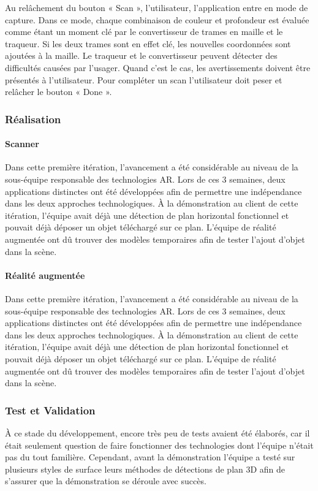 \documentclass[rapport.tex]{subfiles}
\begin{document}
\par
Au relâchement du bouton « Scan », l’utilisateur, l’application entre en mode de capture. Dans ce mode, chaque combinaison de couleur et profondeur est évaluée comme étant un moment clé par le convertisseur de trames en maille et le traqueur. Si les deux trames sont en effet clé, les nouvelles coordonnées sont ajoutées à la maille. Le traqueur et le convertisseur peuvent détecter des difficultés causées par l’usager. Quand c’est le cas, les avertissements doivent être présentés à l’utilisateur. Pour compléter un scan l’utilisateur doit peser et relâcher le bouton « Done ».
\subsubsection*{Réalisation}
\paragraph*{Scanner}
Dans cette première itération, l’avancement a été considérable au niveau de la sous-équipe responsable des technologies AR. Lors de ces 3 semaines, deux applications distinctes ont été développées afin de permettre une indépendance dans les deux approches technologiques. À la démonstration au client de cette itération, l’équipe avait déjà une détection de plan horizontal fonctionnel et pouvait déjà déposer un objet téléchargé sur ce plan. L’équipe de réalité augmentée ont dû trouver des modèles temporaires afin de tester l’ajout d’objet dans la scène.
\paragraph*{Réalité augmentée}
Dans cette première itération, l’avancement a été considérable au niveau de la sous-équipe responsable des technologies AR. Lors de ces 3 semaines, deux applications distinctes ont été développées afin de permettre une indépendance dans les deux approches technologiques. À la démonstration au client de cette itération, l’équipe avait déjà une détection de plan horizontal fonctionnel et pouvait déjà déposer un objet téléchargé sur ce plan. L’équipe de réalité augmentée ont dû trouver des modèles temporaires afin de tester l’ajout d’objet dans la scène.
\subsubsection*{Test et Validation}
À ce stade du développement, encore très peu de tests avaient été élaborés, car il était seulement question de faire fonctionner des technologies dont l’équipe n’était pas du tout familière. Cependant, avant la démonstration l’équipe a testé sur plusieurs styles de surface leurs méthodes de détections de plan 3D afin de s’assurer que la démonstration se déroule avec succès.
\newpage
\end{document}
